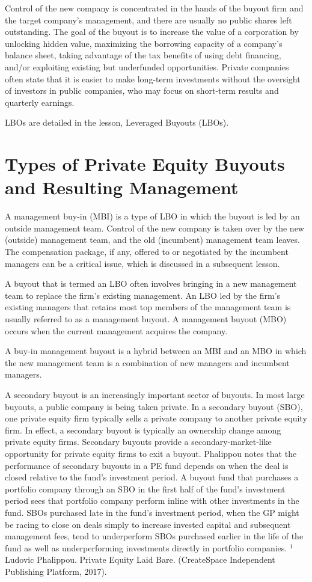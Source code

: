 \documentclass[11pt]{article}
\begin{document}
Control of the new company is concentrated in the hands of the buyout firm and the target company's management, and there are usually no public shares left outstanding. The goal of the buyout is to increase the value of a corporation by unlocking hidden value, maximizing the borrowing capacity of a company's balance sheet, taking advantage of the tax benefits of using debt financing, and/or exploiting existing but underfunded opportunities. Private companies often state that it is easier to make long-term investments without the oversight of investors in public companies, who may focus on short-term results and quarterly earnings.

LBOs are detailed in the lesson, Leveraged Buyouts (LBOs).

\section*{Types of Private Equity Buyouts and Resulting Management}
A management buy-in (MBI) is a type of LBO in which the buyout is led by an outside management team. Control of the new company is taken over by the new (outside) management team, and the old (incumbent) management team leaves. The compensation package, if any, offered to or negotiated by the incumbent managers can be a critical issue, which is discussed in a subsequent lesson.

A buyout that is termed an LBO often involves bringing in a new management team to replace the firm's existing management. An LBO led by the firm's existing managers that retains most top members of the management team is usually referred to as a management buyout. A management buyout (MBO) occurs when the current management acquires the company.

A buy-in management buyout is a hybrid between an MBI and an MBO in which the new management team is a combination of new managers and incumbent managers.

A secondary buyout is an increasingly important sector of buyouts. In most large buyouts, a public company is being taken private. In a secondary buyout (SBO), one private equity firm typically sells a private company to another private equity firm. In effect, a secondary buyout is typically an ownership change among private equity firms. Secondary buyouts provide a secondary-market-like opportunity for private equity firms to exit a buyout. Phalippou notes that the performance of secondary buyouts in a PE fund depends on when the deal is closed relative to the fund's investment period. A buyout fund that purchases a portfolio company through an SBO in the first half of the fund's investment period sees that portfolio company perform inline with other investments in the fund. SBOs purchased late in the fund's investment period, when the GP might be racing to close on deals simply to increase invested capital and subsequent management fees, tend to underperform SBOs purchased earlier in the life of the fund as well as underperforming investments directly in portfolio companies. ${ }^{1}$ Ludovic Phalippou. Private Equity Laid Bare. (CreateSpace Independent Publishing Platform, 2017).
\end{document}
